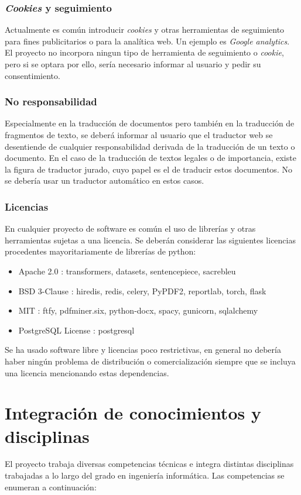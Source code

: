 \subsubsection{\textit{Cookies} y seguimiento}
Actualmente es común introducir \textit{cookies} y otras herramientas de seguimiento para fines publicitarios o para la analítica web. Un ejemplo es \textit{Google analytics}. El proyecto no incorpora ningun tipo de herramienta de seguimiento o \textit{cookie}, pero si se optara por ello, sería necesario informar al usuario y pedir su consentimiento.

\subsubsection{No responsabilidad}
Especialmente en la traducción de documentos pero también en la traducción de fragmentos de texto, se deberá informar al usuario que el traductor web se desentiende de cualquier responsabilidad derivada de la traducción de un texto o documento. En el caso de la traducción de textos legales o de importancia, existe la figura de traductor jurado, cuyo papel es el de traducir estos documentos. No se debería usar un traductor automático en estos casos.

\subsubsection{Licencias}
En cualquier proyecto de software es común el uso de librerías y otras herramientas sujetas a una licencia. Se deberán considerar las siguientes licencias procedentes mayoritariamente de librerías de python:
\begin{itemize}
    \item Apache 2.0 \cite{Apache2license}: transformers, datasets, sentencepiece, sacrebleu
    \item BSD 3-Clause \cite{BSD3Clause}: hiredis, redis, celery, PyPDF2, reportlab, torch, flask
    \item MIT \cite{MITLicense}: ftfy, pdfminer.six, python-docx, spacy, gunicorn, sqlalchemy
    \item PostgreSQL License \cite{Postgreslicense}: postgresql
\end{itemize}
Se ha usado software libre y licencias poco restrictivas, en general no debería haber ningún problema de distribución o comercialización siempre que se incluya una licencia mencionando estas dependencias.

\section{Integración de conocimientos y disciplinas}
El proyecto trabaja diversas competencias técnicas e integra distintas disciplinas trabajadas a lo largo del grado en ingeniería informática. Las competencias se enumeran a continuación:

